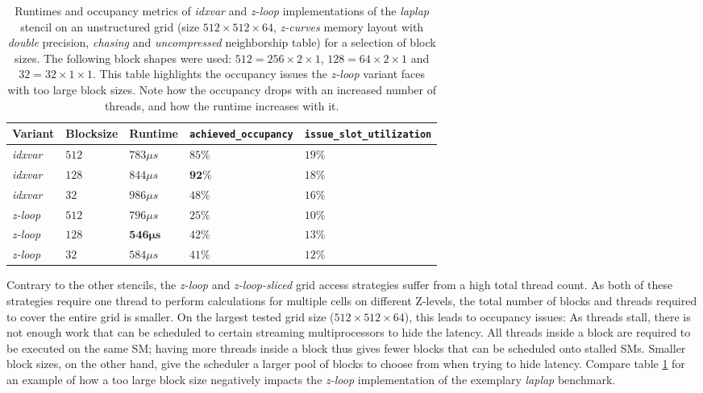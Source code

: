\begin{table}
	\begin{center}
    \begin{tabular}{l l l p{2.5cm} p{2.5cm}}
        \hline
        \textbf{Variant} & \textbf{Blocksize} & \textbf{Runtime} & \textbf{\texttt{achieved\_\allowbreak occupancy}} & \textbf{\texttt{issue\_\allowbreak slot\_\allowbreak utilization}} \\
        \hline
        \hline
        \emph{idxvar} & $512$ & $783\mu s$ & $85\%$ & $19\%$ \\
        \emph{idxvar} & $128$ & $844\mu s$ & $\mathbf{92\%}$ & $18\%$ \\
        \emph{idxvar} & $32$  & $986\mu s$ & $48\%$ & $16\%$ \\
        \emph{z-loop} & $512$ & $796\mu s$ & $25\%$ & $10\%$\\
        \emph{z-loop} & $128$ & $\mathbf{546\mu s}$ & $42\%$ & $13\%$ \\ 
        \emph{z-loop} & $32$  & $584\mu s$ & $41\%$ & $12\%$ \\
        \hline
    \end{tabular}
	\end{center}
    \caption{\label{tab:laplap-blocksize-occupancy} Runtimes and occupancy metrics of \emph{idxvar} and \emph{z-loop} implementations of the \emph{laplap} stencil on an unstructured grid (size $512\times 512\times 64$, \emph{z-curves} memory layout with \emph{double} precision, \emph{chasing} and \emph{uncompressed} neighborship table) for a selection of block sizes. The following block shapes were used: $512 = 256\times 2\times 1$, $128 = 64\times 2\times 1$ and $32 = 32\times 1 \times 1$. This table highlights the occupancy issues the \emph{z-loop} variant faces with too large block sizes. Note how the occupancy drops with an increased number of threads, and how the runtime increases with it.}
\end{table}

Contrary to the other stencils, the \emph{z-loop} and \emph{z-loop-sliced} grid access strategies suffer from a high total thread count. As both of these strategies require one thread to perform calculations for multiple cells on different Z-levels, the total number of blocks and threads required to cover the entire grid is smaller. On the largest tested grid size ($512\times 512\times 64$), this leads to occupancy issues: As threads stall, there is not enough work that can be scheduled to certain streaming multiprocessors to hide the latency. All threads inside a block are required to be executed on the same SM; having more threads inside a block thus gives fewer blocks that can be scheduled onto stalled SMs. Smaller block sizes, on the other hand, give the scheduler a larger pool of blocks to choose from when trying to hide latency. Compare table \ref{tab:laplap-blocksize-occupancy} for an example of how a too large block size negatively impacts the \emph{z-loop} implementation of the exemplary \emph{laplap} benchmark.